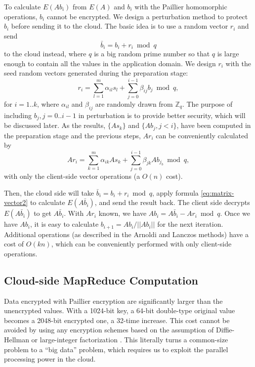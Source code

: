 \documentclass[10pt, conference, compsocconf]{IEEEtran}
\begin{document}
To calculate $E(Ab_i)$ from $E(A)$ and $b_i$ with the Paillier homomorphic operations, $b_i$ cannot be encrypted. We design a perturbation method to protect $b_i$ before sending it to the cloud. The basic idea is to use a random vector $r_i$ and send 
\begin{equation} \label{eq:hidden-vector}
\bar{b}_i=b_i+r_i \bmod q
\end{equation}
to the cloud instead, where $q$ is a big random prime number so that $q$ is large enough to contain all the values in the application domain. We design $r_i$ with the seed random vectors generated during the preparation stage:
\begin{equation}
r_i = \sum_{l=1}^{m} \alpha_{il} s_l + \sum_{j=0}^{i-1}\beta_{ij} b_j\bmod q,
\end{equation}
for $i=1..k$, where $\alpha_{il}$ and $\beta_{ij}$ are randomly drawn from $\mathbb{Z}_q$. The purpose of including $b_j, j=0..i-1$ in perturbation is to provide better security, which will be discussed later. As the results, $\{As_k\}$ and $\{Ab_j, j<i\}$, have been computed in the preparation stage and the previous steps, $Ar_i$ can be conveniently calculated by
\begin{equation}
Ar_i = \sum_{k=1}^{m} \alpha_{ik} As_k + \sum_{j=0}^{i-1}\beta_{jk}Ab_{j_b} \bmod q, 
\end{equation}
with only the client-side vector operations (a $O(n)$ cost). 

Then, the cloud side will take $\bar{b}_i= b_i+r_i \bmod q$, apply formula \ref{eq:matrix-vector2} to calculate $E(A\bar{b}_i)$, and send the result back. The client side decrypts $E(A\bar{b}_i)$ to get $A\bar{b}_i$. With $Ar_i$ known, we have $Ab_i = A\bar{b}_i - Ar_i  \bmod q $. Once we have $Ab_i$, it is easy to calculate $b_{i+1} = Ab_i/||Ab_i||$ for the next iteration. Additional operations (as described in the Arnoldi and Lanczos methods) have a cost of $O(kn)$, which can be conveniently performed with only client-side operations. 


\subsection{Cloud-side MapReduce Computation}



Data encrypted with Paillier encryption are significantly larger than the unencrypted values. With a 1024-bit key, a 64-bit double-type original value becomes a 2048-bit encrypted one, a 32-time increase. This cost cannot be avoided by using any encryption schemes based on the assumption of Diffie-Hellman or large-integer factorization \cite{katz07}. This literally turns a common-size problem to a ``big data'' problem, which requires us to exploit the parallel processing power in the cloud.   
\end{document}
